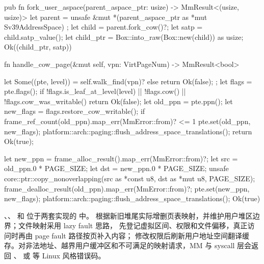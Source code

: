 \begin{rustcode}
pub fn fork_user_aspace(parent_aspace_ptr: usize) -> MmResult<(usize, usize)> {
    let parent = unsafe { &mut *(parent_aspace_ptr as *mut Sv39AddressSpace) };
    let child = parent.fork_cow()?;
    let satp = child.satp_value();
    let child_ptr = Box::into_raw(Box::new(child)) as usize;
    Ok((child_ptr, satp))
}

fn handle_cow_page(&mut self, vpn: VirtPageNum) -> MmResult<bool> {
    let Some((pte, level)) = self.walk_find(vpn)? else {
        return Ok(false);
    };
    let flags = pte.flags();
    if !flags.is_leaf_at_level(level) || !flags.cow() || !flags.cow_was_writable() {
        return Ok(false);
    }
    let old_ppn = pte.ppn();
    let new_flags = flags.restore_cow_writable();
    if frame_ref_count(old_ppn).map_err(MmError::from)? <= 1 {
        pte.set(old_ppn, new_flags);
        platform::arch::paging::flush_address_space_translations();
        return Ok(true);
    }

    let new_ppn = frame_alloc_result().map_err(MmError::from)?;
    let src = old_ppn.0 * PAGE_SIZE;
    let dst = new_ppn.0 * PAGE_SIZE;
    unsafe {
        core::ptr::copy_nonoverlapping(src as *const u8, dst as *mut u8, PAGE_SIZE);
    }
    frame_dealloc_result(old_ppn).map_err(MmError::from)?;
    pte.set(new_ppn, new_flags);
    platform::arch::paging::flush_address_space_translations();
    Ok(true)
}
\end{rustcode}

、、 和  位于两套实现的  中。 根据新旧堆尾实际增删页表映射，并维护用户堆区边界；文件映射采用 lazy fault 思路， 先登记虚拟区间、权限和文件偏移，真正访问时再由 page fault 路径按页补入内容； 修改权限后刷新用户地址空间翻译缓存。对非法地址、越界用户缓冲区和不可满足的映射请求，MM 与 syscall 层会返回 、 或  等 Linux 风格错误码。

